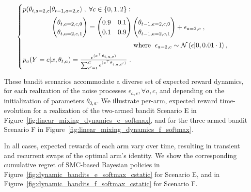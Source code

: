 \begin{equation}
\begin{cases}
\vspace*{1ex}
p(\theta_{t,a=2,c}|\theta_{t-1,a=2,c})\;, \; \forall c \in \{0,1,2\}:\\ \vspace*{1ex}
\hspace*{10ex}\begin{pmatrix}
\theta_{t,a=2,c,0}\\
\theta_{t,a=2,c,1}\\
\end{pmatrix} = \begin{pmatrix}
0.9 & 0.1 \\
0.1 & 0.9 \\
\end{pmatrix} \begin{pmatrix}
\theta_{t-1,a=2,c,0}\\
\theta_{t-1,a=2,c,1}\\
\end{pmatrix} + \epsilon_{a=2,c} \;, \\ \vspace*{1ex}
\hspace*{38ex} \text{where } \; \epsilon_{a=2,c} \sim \N{\epsilon|0,0.01 \cdot\mathrm{I}},\\

p_a(Y=c|x,\theta_{t,a})=\frac{e^{(x^\top\theta_{t,a,c})}}{\sum_{c'=1}^C e^{(x^\top\theta_{t,a,c'})} } \; .
\end{cases}
\label{eq:linear_mixing_dynamics_f}
\end{equation}

These bandit scenarios accommodate a diverse set of expected reward dynamics,
for each realization of the noise processes $\epsilon_{a,c}, \forall a,c$,
and depending on the initialization of parameters $\theta_{0,a}$.
%
We illustrate per-arm, expected reward time-evolution for a realization
of the two-armed bandit Scenario E in Figure~\ref{fig:linear_mixing_dynamics_e_softmax},
and for the three-armed bandit Scenario F in Figure~\ref{fig:linear_mixing_dynamics_f_softmax}.

In all cases, expected rewards of each arm vary over time,
resulting in transient and recurrent swaps of the optimal arm's identity.
We show the corresponding cumulative regret of SMC-based Bayesian policies
in Figure~\ref{fig:dynamic_bandits_e_softmax_cstatic} for Scenario E,
and in Figure~\ref{fig:dynamic_bandits_f_softmax_cstatic} for Scenario F.

